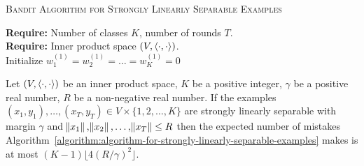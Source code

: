 \begin{algorithm}[h]
\SetAlgoLined
\LinesNumbered
\caption{\textsc{Bandit Algorithm for Strongly Linearly Separable Examples}
\label{algorithm:algorithm-for-strongly-linearly-separable-examples}}
\textbf{Require:} Number of classes $K$, number of rounds $T$. \\
\textbf{Require:} Inner product space $(V,\left\langle \cdot, \cdot \right\rangle)$.  \\
\nl Initialize $w_1^{(1)} = w_2^{(1)} = \dots = w_K^{(1)} = 0$\\
\nl {}
\end{algorithm}

\begin{theorem}
\label{theorem:strongly-separable-examples-mistake-upper-bound}
Let $(V, \left\langle \cdot, \cdot \right\rangle)$ be an inner product space, $K$ be a positive
integer, $\gamma$ be a positive real number, $R$ be a non-negative real number.
If the examples $(x_1, y_1), \dots, (x_T, y_T) \in V \times \{1,2,\dots,K\}$ are
strongly linearly separable with margin $\gamma$ and $\norm{x_1}, \norm{x_2},
\dots, \norm{x_T} \le R$ then the expected number of mistakes
Algorithm~\ref{algorithm:algorithm-for-strongly-linearly-separable-examples}
makes is at most $(K-1) \lfloor 4(R/\gamma)^2 \rfloor$.
\end{theorem}

